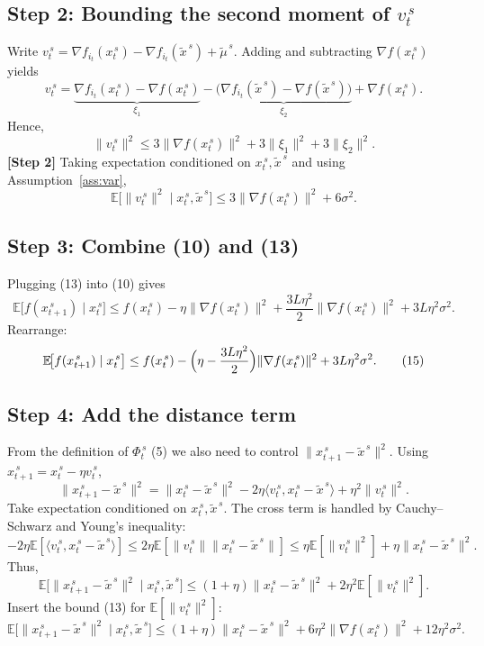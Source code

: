 \documentclass{article}
\newcommand{\EE}{\mathbb{E}}
\begin{document}
\subsection*{Step 2: Bounding the second moment of $v_t^{\,s}$}
Write $v_t^{\,s}= \nabla f_{i_t}(x_{t}^{\,s})-\nabla f_{i_t}(\tilde{x}^{\,s})+\tilde{\mu}^{\,s}$.  Adding and subtracting $\nabla f(x_{t}^{\,s})$ yields
\[
v_t^{\,s}= \underbrace{\nabla f_{i_t}(x_{t}^{\,s})-\nabla f(x_{t}^{\,s})}_{\xi_{1}}
-\underbrace{\bigl(\nabla f_{i_t}(\tilde{x}^{\,s})-\nabla f(\tilde{x}^{\,s})\bigr)}_{\xi_{2}}
+\nabla f(x_{t}^{\,s}).
\tag{11}
\]
Hence,
\[
\|v_t^{\,s}\|^{2}
\le 3\|\nabla f(x_{t}^{\,s})\|^{2}+3\|\xi_{1}\|^{2}+3\|\xi_{2}\|^{2}.
\tag{12}
\]
\textbf{[Step 2]} Taking expectation conditioned on $x_{t}^{\,s},\tilde{x}^{\,s}$ and using Assumption~\ref{ass:var},
\[
\EE\!\bigl[\|v_t^{\,s}\|^{2}\mid x_{t}^{\,s},\tilde{x}^{\,s}\bigr]
\le 3\|\nabla f(x_{t}^{\,s})\|^{2}+6\sigma^{2}.
\tag{13}
\]

\subsection*{Step 3: Combine (10) and (13)}
Plugging (13) into (10) gives
\[
\EE\!\bigl[f(x_{t+1}^{\,s})\mid x_{t}^{\,s}\bigr]
\le f(x_{t}^{\,s})-\eta\|\nabla f(x_{t}^{\,s})\|^{2}
+\frac{3L\eta^{2}}{2}\|\nabla f(x_{t}^{\,s})\|^{2}+3L\eta^{2}\sigma^{2}.
\tag{14}
\]
Rearrange:
\[
\EE\!\bigl[f(x_{t+1}^{\,s})\mid x_{t}^{\,s}\bigr]
\le f(x_{t}^{\,s})-\Bigl(\eta-\frac{3L\eta^{2}}{2}\Bigr)\|\nabla f(x_{t}^{\,s})\|^{2}
+3L\eta^{2}\sigma^{2}.
\tag{15}
\]

\subsection*{Step 4: Add the distance term}
From the definition of $\Phi_{t}^{\,s}$ (5) we also need to control $\|x_{t+1}^{\,s}-\tilde{x}^{\,s}\|^{2}$.
Using $x_{t+1}^{\,s}=x_{t}^{\,s}-\eta v_t^{\,s}$,
\[
\|x_{t+1}^{\,s}-\tilde{x}^{\,s}\|^{2}
= \|x_{t}^{\,s}-\tilde{x}^{\,s}\|^{2}
-2\eta\langle v_t^{\,s},x_{t}^{\,s}-\tilde{x}^{\,s}\rangle
+\eta^{2}\|v_t^{\,s}\|^{2}.
\tag{16}
\]
Take expectation conditioned on $x_{t}^{\,s},\tilde{x}^{\,s}$.  The cross term is handled by Cauchy–Schwarz and Young’s inequality:
\[
-2\eta\EE[\langle v_t^{\,s},x_{t}^{\,s}-\tilde{x}^{\,s}\rangle]
\le 2\eta\EE[\|v_t^{\,s}\|\|x_{t}^{\,s}-\tilde{x}^{\,s}\|]
\le \eta\EE[\|v_t^{\,s}\|^{2}]+ \eta\|x_{t}^{\,s}-\tilde{x}^{\,s}\|^{2}.
\tag{17}
\]
Thus,
\[
\EE\!\bigl[\|x_{t+1}^{\,s}-\tilde{x}^{\,s}\|^{2}\mid x_{t}^{\,s},\tilde{x}^{\,s}\bigr]
\le (1+\eta)\|x_{t}^{\,s}-\tilde{x}^{\,s}\|^{2}+2\eta^{2}\EE[\|v_t^{\,s}\|^{2}].
\tag{18}
\]
Insert the bound (13) for $\EE[\|v_t^{\,s}\|^{2}]$:
\[
\EE\!\bigl[\|x_{t+1}^{\,s}-\tilde{x}^{\,s}\|^{2}\mid x_{t}^{\,s},\tilde{x}^{\,s}\bigr]
\le (1+\eta)\|x_{t}^{\,s}-\tilde{x}^{\,s}\|^{2}
+6\eta^{2}\|\nabla f(x_{t}^{\,s})\|^{2}+12\eta^{2}\sigma^{2}.
\tag{19}
\]
\end{document}
